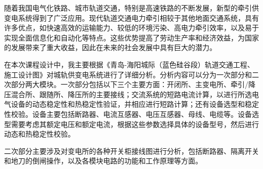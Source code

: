 \begin{cnabstract}
随着我国电气化铁路、城市轨道交通，特别是高速铁路的不断发展，新型的牵引供变电系统得到了广泛应用。现代轨道交通电力牵引相较于其他地面交通系统，具有许多优点，如快速高效的运输能力、较低的环境污染、高电力牵引效率，以及易于实现全面信息化和自动化等特点。这些优势提高了劳动生产率和经济效益，为国家的发展带来了重大收益，因此在未来的社会发展中具有巨大的潜力。\par 

在本次课程设计中，我主要根据《青岛-海阳城际（蓝色硅谷段）轨道交通工程、施工设计图》对城轨供变电系统进行了详细分析。分析内容可以分为一次部分和二次部分两大模块。一次部分包括以下三个主要方面：开闭所、主变电所、牵引/降压混合所、跟随所、降压所的主要接线；交流系统的短路电流计算，以进行所选电气设备的动态稳定性和热稳定性验证，并相应进行短路计算；还有设备选型和稳定性校验。设备主要包括断路器、电流互感器、电压互感器、母线、电缆等。设备选型需要考虑其额定电压和额定电流，根据这些参数选择具体的设备型号，然后进行动态和热稳定性校验。\par 

二次部分主要涉及对变电所的各种开关柜接线图进行分析，包括断路器、隔离开关和地刀的倒闸操作，以及各模块电路的功能和工作原理等方面。
\end{cnabstract}
\vspace{1em}\par


